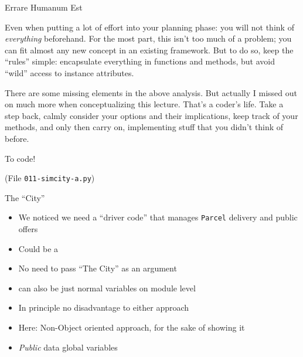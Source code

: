 
\begin{frame}{Errare Humanum Est}
%
\begin{hintbox}
Even when putting a lot of effort into your planning phase: you will not think of \emph{everything} beforehand. For the most part, this isn't too much of a problem; you can fit almost any new concept in an existing framework. But to do so, keep the \enquote{rules} simple: encapsulate everything in functions and methods, but avoid \enquote{wild} access to instance attributes.

There are some missing elements in the above analysis. But actually I missed out on much more when conceptualizing this lecture. That's a coder's life. Take a step back, calmly consider your options and their implications, keep track of your methods, and only then carry on, implementing stuff that you didn't think of before.
\end{hintbox}
%
\end{frame}


\begin{frame}{To code!}
%
\begin{center}
\begin{Large}
(File \texttt{011-simcity-a.py})
\end{Large}
\end{center}
%
\end{frame}


\begin{frame}[fragile]{The \enquote{City}}
%
\begin{itemize}
\item We noticed we need a \enquote{driver code} that manages \texttt{Parcel} delivery and public offers
\item Could be a 
\item No need to pass \enquote{The City} as an argument
\item[\Thus] can also be just normal variables on module level
\item In principle no disadvantage to either approach
\item Here: Non-Object oriented approach, for the sake of showing it
\item \emph{Public} data \Thus global variables
\end{itemize}
%
\end{frame}

